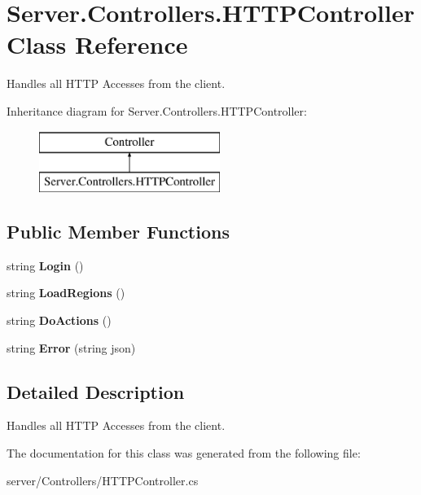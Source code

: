 \hypertarget{classServer_1_1Controllers_1_1HTTPController}{\section{Server.\-Controllers.\-H\-T\-T\-P\-Controller Class Reference}
\label{classServer_1_1Controllers_1_1HTTPController}
}


Handles all H\-T\-T\-P Accesses from the client.  


Inheritance diagram for Server.\-Controllers.\-H\-T\-T\-P\-Controller\-:\begin{figure}[H]
\begin{center}
\leavevmode
\includegraphics[height=2.000000cm]{classServer_1_1Controllers_1_1HTTPController}
\end{center}
\end{figure}
\subsection*{Public Member Functions}
\begin{DoxyCompactItemize}
\item 
\hypertarget{classServer_1_1Controllers_1_1HTTPController_a6453154b955fdc0489918911ada9a2fe}{string {\bfseries Login} ()}\label{classServer_1_1Controllers_1_1HTTPController_a6453154b955fdc0489918911ada9a2fe}

\item 
\hypertarget{classServer_1_1Controllers_1_1HTTPController_a78d73441582128cbd993f76945bf02b2}{string {\bfseries Load\-Regions} ()}\label{classServer_1_1Controllers_1_1HTTPController_a78d73441582128cbd993f76945bf02b2}

\item 
\hypertarget{classServer_1_1Controllers_1_1HTTPController_abe809c376d42128665af872585ebe0a4}{string {\bfseries Do\-Actions} ()}\label{classServer_1_1Controllers_1_1HTTPController_abe809c376d42128665af872585ebe0a4}

\item 
\hypertarget{classServer_1_1Controllers_1_1HTTPController_a040798f6ea7252caeaebee82d637957f}{string {\bfseries Error} (string json)}\label{classServer_1_1Controllers_1_1HTTPController_a040798f6ea7252caeaebee82d637957f}

\end{DoxyCompactItemize}


\subsection{Detailed Description}
Handles all H\-T\-T\-P Accesses from the client. 



The documentation for this class was generated from the following file\-:\begin{DoxyCompactItemize}
\item 
server/\-Controllers/H\-T\-T\-P\-Controller.\-cs\end{DoxyCompactItemize}
